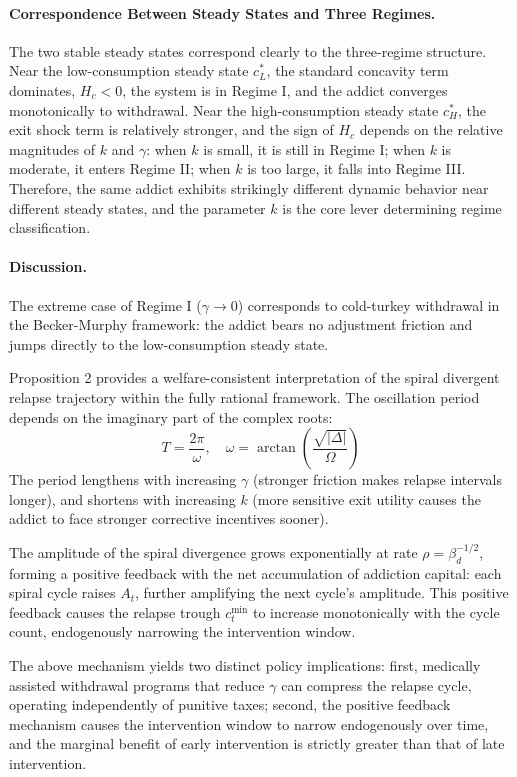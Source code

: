 \documentclass[12pt]{article}
\begin{document}
\paragraph{Correspondence Between Steady States and Three Regimes.}
The two stable steady states correspond clearly to the three-regime structure. Near the low-consumption steady state $c_L^*$, the standard concavity term
dominates, $H_c < 0$, the system is in Regime I, and the addict converges monotonically to withdrawal. Near the high-consumption steady state $c_H^*$,
the exit shock term is relatively stronger, and the sign of $H_c$ depends on the relative magnitudes of $k$ and $\gamma$: when $k$ is small, it is still in
Regime I; when $k$ is moderate, it enters Regime II; when $k$ is too large, it falls into Regime III. Therefore, the same addict exhibits strikingly different dynamic behavior near different steady states,
and the parameter $k$ is the core lever determining regime classification.

\paragraph{Discussion.}
The extreme case of Regime I ($\gamma \to 0$) corresponds to cold-turkey withdrawal in the Becker-Murphy framework: the addict
bears no adjustment friction and jumps directly to the low-consumption steady state.

Proposition 2 provides a welfare-consistent interpretation of the spiral divergent relapse trajectory within the fully rational framework. The oscillation period
depends on the imaginary part of the complex roots:
\begin{equation}\label{eq:period}
T = \frac{2\pi}{\omega}, \quad
\omega = \arctan\!\left(\frac{\sqrt{|\Delta|}}{\Omega}\right)
\end{equation}
The period lengthens with increasing $\gamma$ (stronger friction makes relapse intervals longer), and shortens with increasing $k$
(more sensitive exit utility causes the addict to face stronger corrective incentives sooner).

The amplitude of the spiral divergence grows exponentially at rate $\rho = \beta_d^{-1/2}$, forming a positive
feedback with the net accumulation of addiction capital: each spiral cycle raises $A_t$, further amplifying the next cycle's amplitude. This positive feedback causes the relapse trough
$c_t^{\min}$ to increase monotonically with the cycle count, endogenously narrowing the intervention window.

The above mechanism yields two distinct policy implications: first, medically assisted withdrawal programs that reduce $\gamma$ can compress
the relapse cycle, operating independently of punitive taxes; second, the positive feedback mechanism causes the intervention window to narrow endogenously over time,
and the marginal benefit of early intervention is strictly greater than that of late intervention.
\end{document}
